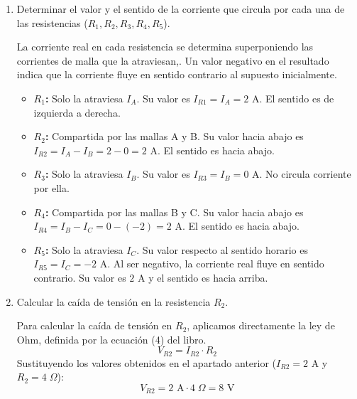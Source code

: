 \documentclass[11pt, a4paper]{article}
\newenvironment{problem}[1][Cuestión]{
		\vspace{0.5cm}
		\noindent{\Large\bfseries #1} \par\vspace{0.5cm}
}{
		\vspace{0.5cm}
}
\begin{document}
\begin{problem}[Problema]
\begin{enumerate}[label=\alph*)]
{					Con $I_B = 0 \text{ A}$, calculamos el resto:
					$$I_A = 1,7(0) + 2 = 2 \text{ A}$$
					$$I_C = 0,8(0) - 2 = -2 \text{ A}$$

					Por lo tanto, las corrientes de malla son: $\boxed{I_A = 2 \text{ A}}$, $\boxed{I_B = 0 \text{ A}}$ e $\boxed{I_C = -2 \text{ A}}$.
				}

			\vspace{0.5cm}

			\item Determinar el valor y el sentido de la corriente que circula por cada una de las resistencias ($R_1,R_2,R_3,R_4,R_5$).

				{ \color{blue} 
					La corriente real en cada resistencia se determina superponiendo las corrientes de malla que la atraviesan,. Un valor negativo en el resultado indica que la corriente fluye en sentido contrario al supuesto inicialmente.
					\begin{itemize}
						\item \textbf{$R_1$:} Solo la atraviesa $I_A$. Su valor es $I_{R1} = I_A = 2 \text{ A}$. El sentido es de izquierda a derecha.
						\item \textbf{$R_2$:} Compartida por las mallas A y B. Su valor hacia abajo es $I_{R2} = I_A - I_B = 2 - 0 = 2 \text{ A}$. El sentido es hacia abajo.
						\item \textbf{$R_3$:} Solo la atraviesa $I_B$. Su valor es $I_{R3} = I_B = 0 \text{ A}$. No circula corriente por ella.
						\item \textbf{$R_4$:} Compartida por las mallas B y C. Su valor hacia abajo es $I_{R4} = I_B - I_C = 0 - (-2) = 2 \text{ A}$. El sentido es hacia abajo.
						\item \textbf{$R_5$:} Solo la atraviesa $I_C$. Su valor respecto al sentido horario es $I_{R5} = I_C = -2 \text{ A}$. Al ser negativo, la corriente real fluye en sentido contrario. Su valor es $2 \text{ A}$ y el sentido es hacia arriba.
					\end{itemize}
				}

			\item Calcular la caída de tensión en la resistencia $R_2$.

				{ \color{blue} 
					Para calcular la caída de tensión en $R_2$, aplicamos directamente la ley de Ohm, definida por la ecuación (4) del libro.
					$$V_{R2} = I_{R2} \cdot R_2$$
					Sustituyendo los valores obtenidos en el apartado anterior ($I_{R2} = 2 \text{ A}$ y $R_2 = 4 \;\Omega$):
					$$\boxed{V_{R2} = 2 \text{ A} \cdot 4 \;\Omega = 8 \text{ V}}$$
				}


\end{enumerate}
\end{problem}
\end{document}
